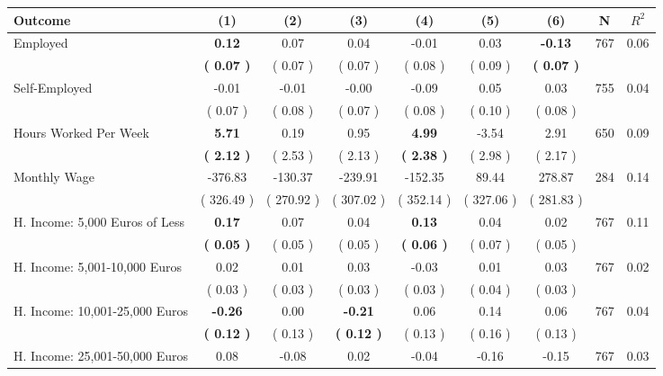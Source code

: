 \begin{tabular}{lcccccccc}
\toprule
 \textbf{Outcome} & \textbf{(1)} & \textbf{(2)} & \textbf{(3)} & \textbf{(4)} & \textbf{(5)} & \textbf{(6)} & \textbf{N} & \textbf{$ R^2$} \\
\midrule
Employed & \textbf{     0.12} &      0.07 &      0.04 &     -0.01 &      0.03 & \textbf{    -0.13} & 767 &       0.06 \\ 
 & \textbf{(     0.07 )} & (     0.07 ) & (     0.07 ) & (     0.08 ) & (     0.09 ) & \textbf{(     0.07 )} & \\
Self-Employed &     -0.01 &     -0.01 &     -0.00 &     -0.09 &      0.05 &      0.03 & 755 &       0.04 \\ 
 & (     0.07 ) & (     0.08 ) & (     0.07 ) & (     0.08 ) & (     0.10 ) & (     0.08 ) & \\
Hours Worked Per Week & \textbf{     5.71} &      0.19 &      0.95 & \textbf{     4.99} &     -3.54 &      2.91 & 650 &       0.09 \\ 
 & \textbf{(     2.12 )} & (     2.53 ) & (     2.13 ) & \textbf{(     2.38 )} & (     2.98 ) & (     2.17 ) & \\
Monthly Wage &   -376.83 &   -130.37 &   -239.91 &   -152.35 &     89.44 &    278.87 & 284 &       0.14 \\ 
 & (   326.49 ) & (   270.92 ) & (   307.02 ) & (   352.14 ) & (   327.06 ) & (   281.83 ) & \\
H. Income: 5,000 Euros of Less & \textbf{     0.17} &      0.07 &      0.04 & \textbf{     0.13} &      0.04 &      0.02 & 767 &       0.11 \\ 
 & \textbf{(     0.05 )} & (     0.05 ) & (     0.05 ) & \textbf{(     0.06 )} & (     0.07 ) & (     0.05 ) & \\
H. Income: 5,001-10,000 Euros &      0.02 &      0.01 &      0.03 &     -0.03 &      0.01 &      0.03 & 767 &       0.02 \\ 
 & (     0.03 ) & (     0.03 ) & (     0.03 ) & (     0.03 ) & (     0.04 ) & (     0.03 ) & \\
H. Income: 10,001-25,000 Euros & \textbf{    -0.26} &      0.00 & \textbf{    -0.21} &      0.06 &      0.14 &      0.06 & 767 &       0.04 \\ 
 & \textbf{(     0.12 )} & (     0.13 ) & \textbf{(     0.12 )} & (     0.13 ) & (     0.16 ) & (     0.13 ) & \\
H. Income: 25,001-50,000 Euros &      0.08 &     -0.08 &      0.02 &     -0.04 &     -0.16 &     -0.15 & 767 &       0.03 \\ 

\end{tabular}
